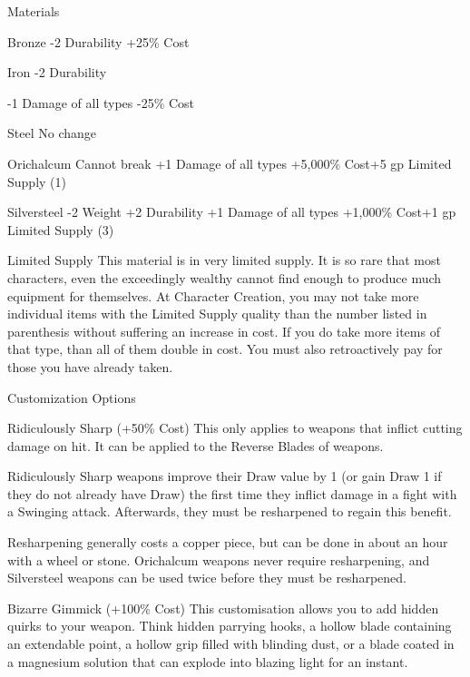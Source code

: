\documentclass[oneside,11pt,english]{book}
\begin{document}
 

Materials 

 

Bronze 
-2 Durability 
+25\% Cost 

 

Iron 
-2 Durability 


-1 Damage of all types 
-25\% Cost 

 

Steel 
No change 

 

Orichalcum 
Cannot break 
+1 Damage of all types 
+5,000\% Cost+5 gp 
Limited Supply (1) 

 

Silversteel 
-2 Weight 
+2 Durability 
+1 Damage of all types 
+1,000\% Cost+1 gp 
Limited Supply (3) 

 

Limited Supply 
This material is in very limited supply. It is so rare that most characters, even the exceedingly wealthy 
cannot find enough to produce much equipment for themselves. At Character Creation, you may not take 
more individual items with the Limited Supply quality than the number listed in parenthesis without 
suffering an increase in cost. If you do take more items of that type, than all of them double in cost. You 
must also retroactively pay for those you have already taken. 

 

 

Customization Options 

 

Ridiculously Sharp (+50\% Cost) 
This only applies to weapons that inflict cutting damage on hit. It can be applied to the Reverse Blades of 
weapons. 

 

Ridiculously Sharp weapons improve their Draw value by 1 (or gain Draw 1 if they do not already have 
Draw) the first time they inflict damage in a fight with a Swinging attack. Afterwards, they must be 
resharpened to regain this benefit. 

 

Resharpening generally costs a copper piece, but can be done in about an hour with a wheel or stone. 
Orichalcum weapons never require resharpening, and Silversteel weapons can be used twice before they 
must be resharpened. 

 


Bizarre Gimmick (+100\% Cost) 
This customisation allows you to add hidden quirks to your weapon. Think hidden parrying hooks, a 
hollow blade containing an extendable point, a hollow grip filled with blinding dust, or a blade coated in a 
magnesium solution that can explode into blazing light for an instant. 
\end{document}
